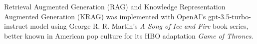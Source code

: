 Retrieval Augmented Generation (RAG) and Knowledge Representation Augmented Generation (KRAG) was implemented with OpenAI's gpt-3.5-turbo-instruct model using George R. R. Martin's \textit{A Song of Ice and Fire} book series, better known in American pop culture for its HBO adaptation \textit{Game of Thrones}.